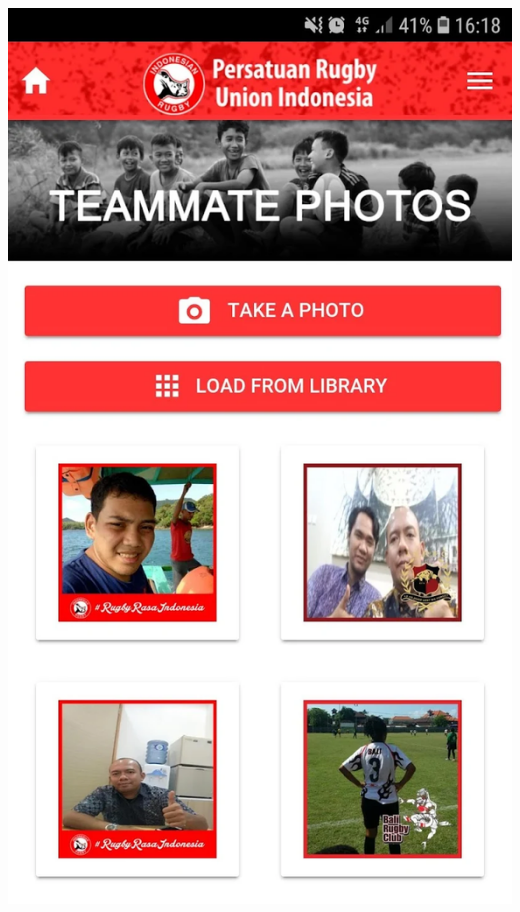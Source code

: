\documentclass[a4paper,twoside]{article}
\begin{document}
\includegraphics[scale=0.125]{teammate_photos.png} \hspace{0.5cm}
\end{document}
